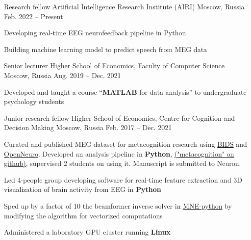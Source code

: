 
\begin{cventries}
  \cventry
    {Research fellow}
    {Artificial Intelligence Research Institute (AIRI)}
    {Moscow, Russia}
    {Feb. 2022 -- Present}
    {
      \begin{cvitems}
      \item Developing real-time EEG neurofeedback pipeline in Python
      \item Building machine learning model to predict speech from MEG data
      \end{cvitems}
    }
  \cventry
    {Senior lecturer}
    {Higher School of Economics, Faculty of Computer Science}
    {Moscow, Russia}
    {Aug. 2019 -- Dec. 2021}
    {
      \begin{cvitems}
      \item Developed and taught a course ``\textbf{MATLAB} for data analysis'' to undergraduate psychology students
      \end{cvitems}
    }
  \cventry
    {Junior research fellow}
    {Higher School of Economics, Centre for Cognition and Decision Making}
    {Moscow, Russia}
    {Feb. 2017 -- Dec. 2021}
    {
      \begin{cvitems}
      \item{Curated and published MEG dataset for metacognition research using \href{https://bids.neuroimaging.io/}{BIDS} and \href{https://openneuro.org/}{OpenNeuro}. Developed an analysis pipeline in \textbf{Python}, \href{https://github.com/dmalt/metacognition}{("metacognition" on github)}, supervised 2 students on using it. Manuscript is submitted to Neuron.}
      \item{Led 4-people group developing software for real-time feature extraction and 3D visualization of brain activity from EEG in \textbf{Python}}
        \item{Sped up by a factor of 10 the beamformer inverse solver in \href{https://github.com/mne-tools/mne-python}{MNE-python} by modifying the algorithm for vectorized computations}
        \item{Administered a laboratory GPU cluster running \textbf{Linux}}
      \end{cvitems}
    }
  \cventry

\end{cventries}

